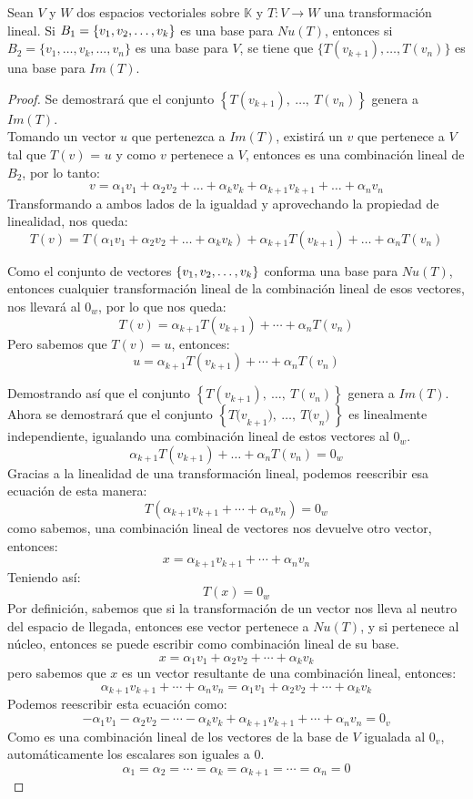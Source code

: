 \newpage
\begin{theorem}
Sean $V$ y $W$ dos espacios vectoriales sobre $\mathbb{K}$ y $T : V \to W$ una transformación lineal. Si $B_1 =  \lbrace v_1, v_2, \ldots, v_k \rbrace$ es una base para $Nu(T)$, entonces si $B_2 = \{v_1 , \ldots , v_{k}, \ldots , v_n\}$ es una base para $V$, se tiene que $\{T(v_{k+1}), \ldots , T(v_n)\}$ es una base para $Im(T)$.
\end{theorem}

\begin{proof}

Se demostrará que el conjunto $\left\{T(v_{k+1}),\ \hdots,\ T(v_n)\right\}$ genera a $Im(T)$.\\
Tomando un vector $u$ que pertenezca a $Im(T)$, existirá un $v$ que
pertenece a $V$ tal que $T(v)$ = $u$
y como $v$ pertenece a $V$, entonces es una combinación lineal de $B_{2}$, por lo tanto:
$$v=\alpha_1v_1+\alpha_2v_2+\hdots+\alpha_kv_k+\alpha_{k+1}v_{k+1}+\hdots+\alpha_nv_n$$
Transformando a ambos lados de la igualdad y aprovechando la propiedad de linealidad, nos queda:
$$T(v)=T(\alpha_1v_1+\alpha_2v_2+\hdots+\alpha_kv_k)+\alpha_{k+1}T(v_{k+1})+\hdots+\alpha_nT(v_n)$$


Como el conjunto de vectores $ \lbrace v_1, v_2, \ldots, v_k \rbrace$ conforma una base para $Nu(T)$, entonces cualquier  transformación lineal de la combinación lineal de esos vectores, nos llevará al $0_w$, por lo que nos queda:
$$T(v)=\alpha_{k+1}T(v_{k+1})+\cdots+\alpha_nT(v_n)$$
Pero sabemos que $T(v) = u$, entonces:
$$u =\alpha_{k+1}T(v_{k+1})+\cdots+\alpha_nT(v_n)$$

Demostrando así que el conjunto $\left\{T(v_{k+1}),\ \hdots ,\ T(v_n)\right\}$ genera a $Im(T)$.\\

Ahora se demostrará que el conjunto $\left\{{T(v}_{k+1}),\ \hdots ,\ {T(v}_n)\ \right\}$ es linealmente independiente, igualando una combinación lineal de estos vectores al $0_w$.
$$\alpha_{k+1}T(v_{k+1})+\hdots+\alpha_nT(v_n) = 0_w$$
Gracias a la linealidad de una transformación lineal, podemos reescribir esa ecuación de esta manera:
$$T(\alpha_{k+1}v_{k+1}+\cdots+\alpha_nv_n) = 0_w$$
como sabemos, una combinación lineal de vectores nos devuelve otro vector, entonces:
$$x = \alpha_{k+1}v_{k+1}+\cdots+\alpha_nv_n$$
Teniendo así:
$$T(x) = 0_w$$
Por definición, sabemos que si la transformación de un vector nos lleva al neutro del espacio de llegada, entonces ese vector pertenece a $Nu(T)$, y si pertenece al núcleo, entonces se puede escribir como combinación lineal de su base.
$$ x = \alpha_1v_1 + \alpha_2v_2 + \cdots + \alpha_kv_k$$
pero sabemos que $x$ es un vector resultante de una combinación lineal, entonces: 
$$\alpha_{k+1}v_{k+1}+\cdots+\alpha_nv_n = \alpha_1v_1 + \alpha_2v_2 + \cdots + \alpha_kv_k$$
Podemos reescribir esta ecuación como:
$$-\alpha_1v_1 - \alpha_2v_2 - \cdots - \alpha_kv_k + \alpha_{k+1}v_{k+1}+\cdots+\alpha_nv_n = 0_v$$
Como es una combinación lineal de los vectores de la base de $V$ igualada al $0_v$, automáticamente los escalares son iguales a 0.
$$\alpha_1 = \alpha_2 =  \cdots = \alpha_k = \alpha_{k+1} = \cdots=\alpha_n = 0$$


\end{proof}
